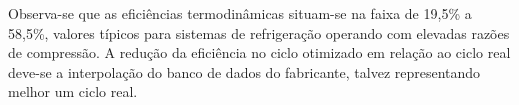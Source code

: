 Observa-se que as eficiências termodinâmicas situam-se na faixa de 19,5\% a 58,5\%, valores típicos para sistemas de refrigeração operando com elevadas razões de compressão. A redução da eficiência no ciclo otimizado em relação ao ciclo real deve-se a interpolação do banco de dados do fabricante, talvez representando melhor um ciclo real.
